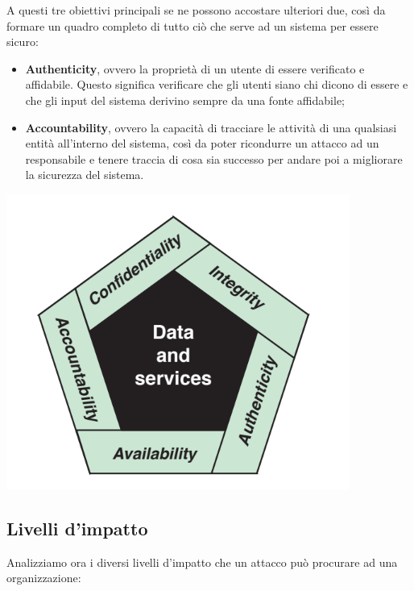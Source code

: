 \documentclass[14pt]{extarticle}
\begin{document}
A questi tre obiettivi principali se ne possono accostare ulteriori due, così da
formare un quadro completo di tutto ciò che serve ad un sistema per essere
sicuro:

\begin{itemize}
    \item \textbf{Authenticity}, ovvero la proprietà di un utente di essere
    verificato e affidabile. Questo significa verificare che gli utenti siano
    chi dicono di essere e che gli input del sistema derivino sempre da una
    fonte affidabile;
    \item \textbf{Accountability}, ovvero la capacità di tracciare le attività
    di una qualsiasi entità all'interno del sistema, così da poter ricondurre un
    attacco ad un responsabile e tenere traccia di cosa sia successo per andare
    poi a migliorare la sicurezza del sistema. 
\end{itemize}

\begin{center}
    \includegraphics{images/CIA.png}
\end{center}

\newpage
\subsection{Livelli d'impatto}

Analizziamo ora i diversi livelli d'impatto che un attacco può procurare ad una
organizzazione:
\end{document}
